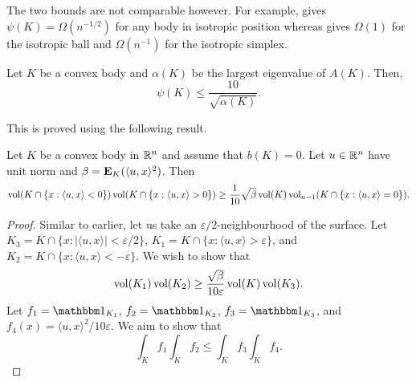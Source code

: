 The two bounds  are not comparable however. For example,  gives $\psi(K)=\Omega(n^{-1/2})$ for any body in isotropic position whereas  gives $\Omega(1)$ for the isotropic ball and $\Omega(n^{-1})$ for the isotropic simplex.\\

\begin{ftheo}
	Let $K$ be a convex body and $\alpha(K)$ be the largest eigenvalue of $A(K)$. Then,
	\[ \psi(K) \leq \frac{10}{\sqrt{\alpha(K)}}. \]
\end{ftheo}

This is proved using the following result.

\begin{theorem}
	Let $K$ be a convex body in $\mathbb{R}^n$ and assume that $b(K)=0$. Let $u\in\mathbb{R}^n$ have unit norm and $\beta=\textbf{E}_K(\langle u,x\rangle^2)$. Then
	\[ \operatorname{vol}(K \cap \{x : \langle u,x\rangle < 0\}) \operatorname{vol}(K \cap \{x : \langle u,x\rangle > 0\}) \geq \frac{1}{10}\sqrt{\beta}\operatorname{vol}(K)\operatorname{vol}_{n-1}(K \cap \{x : \langle u,x\rangle = 0\}). \]
\end{theorem}
\begin{proof}
	Similar to earlier, let us take an $\varepsilon/2$-neighbourhood of the surface. Let $K_3 = K \cap \{x : |\langle u,x\rangle|<\varepsilon/2\}$, $K_1 = K\cap\{x: \langle u,x\rangle > \varepsilon\}$, and $K_2 = K\cap\{x: \langle u,x\rangle < -\varepsilon\}$. We wish to show that
	\[ \operatorname{vol}(K_1)\operatorname{vol}(K_2) \geq \frac{\sqrt{\beta}}{10\varepsilon} \operatorname{vol}(K)\operatorname{vol}(K_3). \]
	Let $f_1=\indic_{K_1}$, $f_2=\indic_{K_2}$, $f_3 = \indic_{K_3}$, and $f_4(x) = \langle u,x\rangle^2/10\varepsilon$. We aim to show that
	\[ \int_K f_1 \int_K f_2 \leq \int_K f_3 \int_K f_4. \]
\end{proof}